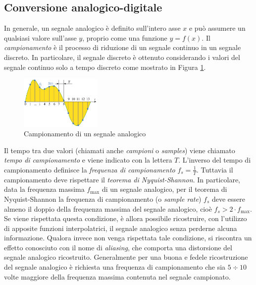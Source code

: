 \documentclass[a4paper,12pt]{report}  %
\begin{document}
\subsection{Conversione analogico-digitale}
In generale, un segnale analogico è definito sull'intero asse $x$ e può assumere un qualsiasi valore sull'asse $y$, proprio come una funzione $y = f(x)$.
Il \textit{campionamento} è il processo di riduzione di un segnale continuo in un segnale discreto.
In particolare, il segnale discreto è ottenuto considerando i valori del segnale continuo solo a tempo discreto come mostrato in Figura \ref{fig:sampling}.

\begin{figure}[h]
    \centering
    \includegraphics[width=0.35\textwidth]{imgs/Signal_Sampling.png}
    \caption{Campionamento di un segnale analogico}
    \label{fig:sampling}
\end{figure}

Il tempo tra due valori (chiamati anche \textit{campioni} o \textit{samples}) viene chiamato \textit{tempo di campionamento} e viene indicato con la lettera $T$.
L'inverso del tempo di campionamento definisce la \textit{frequenza di campionamento} $f_s = \frac{1}{T}$.
Tuttavia il campionamento deve rispettare il \textit{teorema di Nyquist-Shannon}.
In particolare, data la frequenza massima $f_{\text{max}}$ di un segnale analogico, per il teorema di Nyquist-Shannon la frequenza di campionamento (o \textit{sample rate}) $f_s$ deve essere almeno il doppio della frequenza massima del segnale analogico, cioè $f_s > 2 \cdot f_{\text{max}}$.
Se viene rispettata questa condizione, è allora possibile ricostruire, con l'utilizzo di apposite funzioni interpolatrici, il segnale analogico senza perderne alcuna informazione.
Qualora invece non venga rispettata tale condizione, si riscontra un effetto conosciuto con il nome di \textit{aliasing}, che comporta una distorsione del segnale analogico ricostruito.
Generalmente per una buona e fedele ricostruzione del segnale analogico è richiesta una frequenza di campionamento che sia $5 \div 10$ volte maggiore della frequenza massima contenuta nel segnale campionato.
\end{document}
